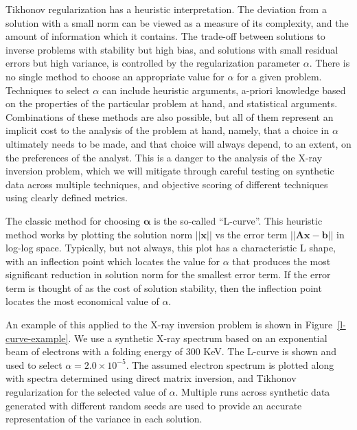 Tikhonov regularization has a heuristic interpretation. The deviation from a solution with a small norm can be viewed as a measure of its complexity, and the amount of information which it contains. The trade-off between solutions to inverse problems with stability but high bias, and solutions with small residual errors but high variance, is controlled by the regularization parameter $\alpha$. There is no single method to choose an appropriate value for $\alpha$ for a given problem. Techniques to select $\alpha$ can include heuristic arguments, a-priori knowledge based on the properties of the particular problem at hand, and statistical arguments. Combinations of these methods are also possible, but all of them represent an implicit cost to the analysis of the problem at hand, namely, that a choice in $\alpha$ ultimately needs to be made, and that choice will always depend, to an extent, on the preferences of the analyst. This is a danger to the analysis of the X-ray inversion problem, which we will mitigate through careful testing on synthetic data across multiple techniques, and objective scoring of different techniques using clearly defined metrics. 

The classic method for choosing $\mathbf{\alpha}$ is the so-called ``L-curve''. This heuristic method works by plotting the solution norm $\vert\vert \mathbf{x} \vert\vert$ vs the error term $\vert \vert \mathbf{A}\mathbf{x} - \mathbf{b} \vert \vert$ in log-log space. Typically, but not always, this plot has a characteristic L shape, with an inflection point which locates the value for $\alpha$ that produces the most significant reduction in solution norm for the smallest error term. If the error term is thought of as the cost of solution stability, then the inflection point locates the most economical value of $\alpha$. 

An example of this applied to the X-ray inversion problem is shown in Figure~\ref{l-curve-example}. We use a synthetic X-ray spectrum based on an exponential beam of electrons with a folding energy of 300 KeV. The L-curve is shown and used to select $\alpha = 2.0\times10^{-5}$. The assumed electron spectrum is plotted along with spectra determined using direct matrix inversion, and Tikhonov regularization for the selected value of $\alpha$. Multiple runs across synthetic data generated with different random seeds are used to provide an accurate representation of the variance in each solution. 

